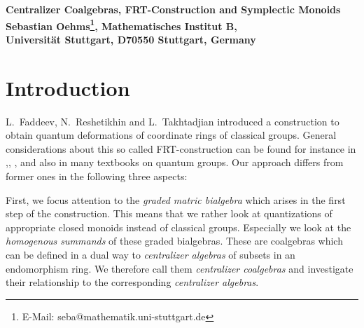 \documentclass[twoside,12pt]{article}
\begin{document}
\newcommand{\spT}{J}
\newcommand{\spq}{d}


\newcommand{\naA}[2]{{\bigwedge}_{#1}(#2)}
\newcommand{\nraA}[3]{{\bigwedge}_{#1}(#2,#3)}
\newcommand{\aA}{\naA{\gr}{n}}
\newcommand{\raA}[1]{\nraA{\gr}{n}{#1}}
\newcommand{\snaA}[2]{{\bigwedge}^{\rm s}_{#1}(#2)}
\newcommand{\snraA}[3]{{\bigwedge}^{\rm s}_{#1}(#2,#3)}
\newcommand{\saA}{\snaA{\gr}{n}}
\newcommand{\sraA}[1]{\snraA{\gr}{n}{#1}}
\newcommand{\gtab}[1]{T^{#1}}                %

\newcommand{\gsmind}[2]{I_{#1}^{#2}}          %
\newcommand{\asmind}[1]{\gsmind{#1}{}} 
\newcommand{\symind}[1]{\gsmind{#1}{\rm sym}}

\newcommand{\itab}[2]{\gtab{#1}_{\ibf{#2}}}  %
\newcommand{\bidet}[3]{\gtab{#1}(#2:#3)}     %

\newcommand{\xes}[2]{x_{#1 #2}}              %
\newcommand{\B}{{\bf B}}                     %
\newcommand{\sign}[1]{{\rm sign}(#1)}        %







\thispagestyle{empty}

\begin{center} 
{\bf \huge Centralizer Coalgebras, FRT-Construction and Symplectic Monoids}
 \\[3mm]
{\bf  Sebastian Oehms\footnote{E-Mail: seba@mathematik.uni-stuttgart.de}, 
Mathematisches Institut B,\\
Universit{\"a}t Stuttgart, D70550 Stuttgart, Germany
}
\end{center}


\section{Introduction}

L.\ Faddeev, N.\ Reshetikhin and L.\ Takhtadjian \cite{frt}
introduced a construction to obtain quantum deformations of
coordinate rings of classical groups.
General considerations about this so called FRT-construction 
can be found for instance in
\cite{manin},\cite{tak2}, \cite{hay4}, \cite{Sudbery} 
and also in many textbooks on quantum groups. 
Our approach differs from former ones in the following three aspects:\Ab

First, we focus attention to the {\em graded matric bialgebra} which
arises in the first step of the construction. This means that we
rather look
at quantizations of appropriate closed monoids instead of classical groups.
Especially we look at the {\em homogenous summands} of these graded bialgebras.
These are coalgebras which can be defined in a dual way to
{\em centralizer algebras} of subsets in an endomorphism ring.
We therefore call them {\em centralizer coalgebras} and investigate their
relationship to the corresponding {\em centralizer algebras}.\Ab
\end{document}
